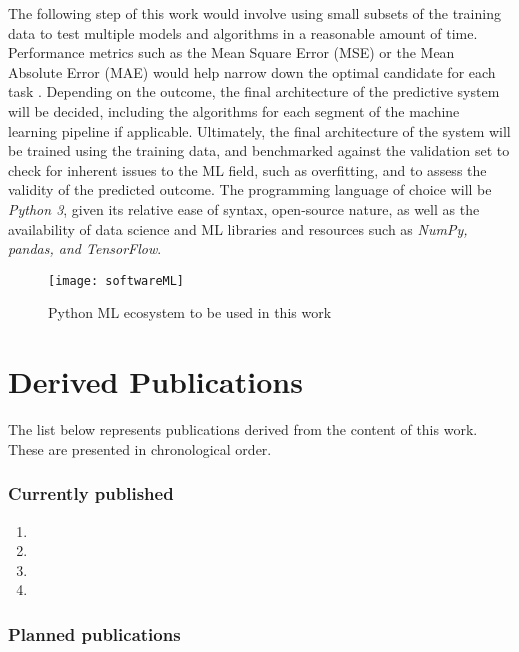 \documentclass[main.tex]{subfiles}
\begin{document}
The following step of this work would involve using small subsets of the training data to test multiple models and algorithms in a reasonable amount of time. Performance metrics such as the Mean Square Error (MSE) or the Mean Absolute Error (MAE) would help narrow down the optimal candidate for each task \cite{Geron2019}. Depending on the outcome, the final architecture of the predictive system will be decided, including the algorithms for each segment of the machine learning pipeline if applicable. Ultimately, the final architecture of the system will be trained using the training data, and benchmarked against the validation set to check for inherent issues to the ML field, such as overfitting, and to assess the validity of the predicted outcome. The programming language of choice will be \emph{Python 3}, given its relative ease of syntax, open-source nature, as well as the availability of data science and ML libraries and resources such as \emph{NumPy, pandas, and TensorFlow}.

\begin{figure}[!htbp]
	\center
	\texttt{[image: softwareML]}
	\caption{Python ML ecosystem to be used in this work} \label{fig:python}
\end{figure} 

\section{Derived Publications}

The list below represents publications derived from the content of this work. These are presented in chronological order.

\subsubsection{Currently published}
\begin{enumerate}
	\item {}
	\item {}
	\item {}
	\item {}
\end{enumerate}

\subsubsection{Planned publications}
\end{document}
